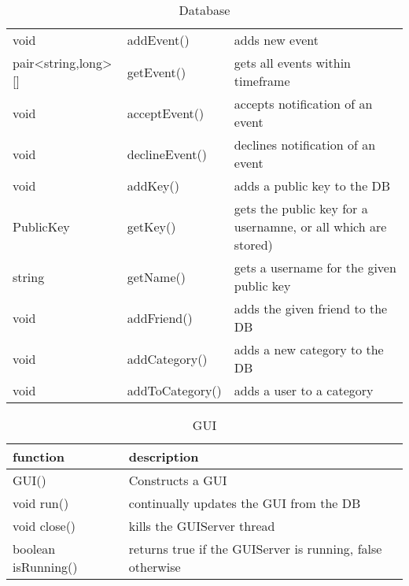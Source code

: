 \begin{table}[h]
\begin{tabular}{p{3cm}p{3cm}p{9cm}}
    void                & addEvent()     & adds new event\\
    pair<string,long>[] & getEvent()     & gets all events within timeframe\\
    void                & acceptEvent()  & accepts notification of an event\\
    void                & declineEvent() & declines notification of an event\\
    
    void      & addKey()  & adds a public key to the DB\\
    PublicKey & getKey()  & gets the public key for a usernamne, or all which are stored)\\
    string    & getName() & gets a username for the given public key\\

    void & addFriend()     & adds the given friend to the DB\\
    void & addCategory()   & adds a new category to the DB\\
    void & addToCategory() & adds a user to a category\\
    \end{tabular}
    \caption{Database}
\end{table}

\begin{table}[h]
    \centering
    \begin{tabular}{p{3.6cm}p{9cm}}
    function     & description\\ \hline
    GUI()        & Constructs a GUI\\
    void run()   & continually updates the GUI from the DB\\
    void close() & kills the GUIServer thread\\
    
    boolean isRunning() & returns true if the GUIServer is running, false otherwise\\
    \end{tabular}
    \caption{GUI}
\end{table}

